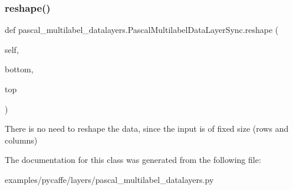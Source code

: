 \subsubsection{\texorpdfstring{reshape()}{reshape()}}
{\footnotesize\ttfamily def pascal\+\_\+multilabel\+\_\+datalayers.\+Pascal\+Multilabel\+Data\+Layer\+Sync.\+reshape (\begin{DoxyParamCaption}\item[{}]{self,  }\item[{}]{bottom,  }\item[{}]{top }\end{DoxyParamCaption})}

\begin{DoxyVerb}There is no need to reshape the data, since the input is of fixed size
(rows and columns)
\end{DoxyVerb}
 

The documentation for this class was generated from the following file\+:\begin{DoxyCompactItemize}
\item 
examples/pycaffe/layers/pascal\+\_\+multilabel\+\_\+datalayers.\+py\end{DoxyCompactItemize}
